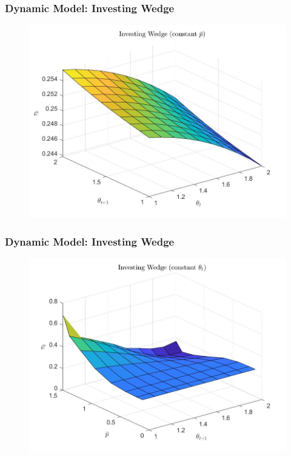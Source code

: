 \documentclass{beamer}
\begin{document}
\begin{frame}
    \frametitle{Dynamic Model: Investing Wedge}

    \begin{figure}[htbp]
        \centering
        \includegraphics[scale = 0.35]{figures/tauk_pfix.jpg}
    \end{figure}

\end{frame}

\begin{frame}
    \frametitle{Dynamic Model: Investing Wedge}

    \begin{figure}[htbp]
        \centering
        \includegraphics[scale = 0.35]{figures/tauk_tfix.jpg}
    \end{figure}

\end{frame}
\end{document}
